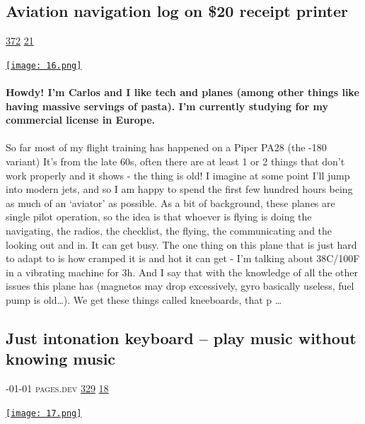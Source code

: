 \documentclass[10pt,a4paper]{article}
\begin{document}
\begin{multicols}{2}
\begin{minipage}{\linewidth}
\subsection{Aviation navigation log on \$20 receipt printer}
\textsc{\footnotesize
{\scriptsize\faThumbsOUp}\space 
\href{http://news.ycombinator.com/item?id=37190743\&utm\_term=comment}{372} 
{\scriptsize\faComments}\space 
\href{http://news.ycombinator.com/item?id=37190743\&utm\_term=comment}{21} 
}
\par\medskip\noindent
\href{https://carloslagoa.com/blog/flipreps/flipreps.html?utm\_source=hackernewsletter\&utm\_medium=email\&utm\_term=show\_hn}{
    \texttt{[image: 16.png]}
}
\end{minipage}
\paragraph{}
\textbf{Howdy! I’m Carlos and I like tech and planes (among other things like having massive servings of pasta). I’m currently studying for my commercial license in Europe.}
\paragraph{}
 So far most of my flight training has happened on a Piper PA28 (the -180 variant)
It’s from the late 60s, often there are at least 1 or 2 things that don’t work properly and it shows - the thing is old! I imagine at some point I’ll jump into modern jets, and so I am happy to spend the first few hundred hours being as much of an ‘aviator’ as possible.
As a bit of background, these planes are single pilot operation, so the idea is that whoever is flying is doing the navigating, the radios, the checklist, the flying, the communicating and the looking out and in. It can get busy.
The one thing on this plane that is just hard to adapt to is how cramped it is and hot it can get - I’m talking about 38C/100F in a vibrating machine for 3h. And I say that with the knowledge of all the other issues this plane has (magnetos may drop excessively, gyro basically useless, fuel pump is old…).
We get these things called kneeboards, that p
\dots\par
\noindent\begin{minipage}{\linewidth}
\medskip
\subsection{Just intonation keyboard – play music without knowing music}
\textsc{\footnotesize
{\scriptsize\faCalendar}-01-01 
{\scriptsize\faGlobe}\space 
pages.dev 
{\scriptsize\faThumbsOUp}\space 
\href{http://news.ycombinator.com/item?id=37194128\&utm\_term=comment}{329} 
{\scriptsize\faComments}\space 
\href{http://news.ycombinator.com/item?id=37194128\&utm\_term=comment}{18} 
}
\par\medskip\noindent
\href{https://ad8e.pages.dev/keyboard?utm\_source=hackernewsletter\&utm\_medium=email\&utm\_term=show\_hn}{
    \texttt{[image: 17.png]}
}
\end{minipage}

\end{multicols}
\end{document}

